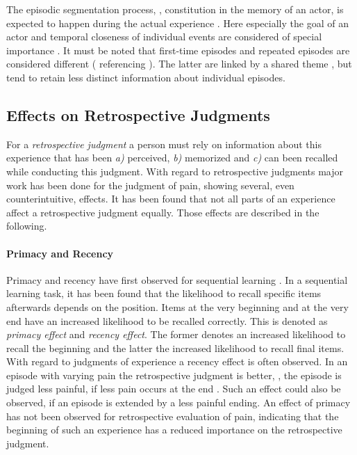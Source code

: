 The episodic segmentation process, \ie, constitution in the memory of an actor, is expected to happen during the actual experience \citep[\cf,][]{ezzyat_what_2011, kurby_segmentation_2008}.
Here especially the goal of an actor and temporal closeness of individual events are considered of special importance \citep[\cf,][]{black_episodes_1979}.
It must be noted that first-time episodes and repeated episodes are considered different (\citet{conway_construction_2000} referencing \citet{barsalou_construction_1988}).
The latter are linked by a shared theme \citep{robinson_first_1992}, but tend to retain less distinct information about individual episodes.

\subsection{Effects on Retrospective Judgments}
For a \emph{retrospective judgment} a person must rely on information about this experience that has been \emph{a)} perceived, \emph{b)} memorized and \emph{c)} can been recalled while conducting this judgment.
With regard to retrospective judgments major work has been done for the judgment of pain, showing several, even counterintuitive, effects.
It has been found that not all parts of an experience affect a retrospective judgment equally.
Those effects are described in the following.

\paragraph*{Primacy and Recency}
Primacy and recency have first observed for sequential learning \citep[\cf,][]{murdock_jr._serial_1962}.
In a sequential learning task, it has been found that the likelihood to recall specific items afterwards depends on the position.
Items at the very beginning and at the very end have an increased likelihood to be recalled correctly.
This is denoted as \emph{primacy effect} and \emph{recency effect}.
The former denotes an increased likelihood to recall the beginning and the latter the increased likelihood to recall final items.
With regard to judgments of experience a recency effect is often observed.
In an episode with varying pain the retrospective judgment is better, \ie, the episode is judged less painful, if less pain occurs at the end \citep[\cf,][]{kahneman_when_1993, redelmeier_patients_1996}.
Such an effect could also be observed, if an episode is extended by a less painful ending.
An effect of primacy has not been observed for retrospective evaluation of pain, indicating that the beginning of such an experience has a reduced importance on the retrospective judgment.

